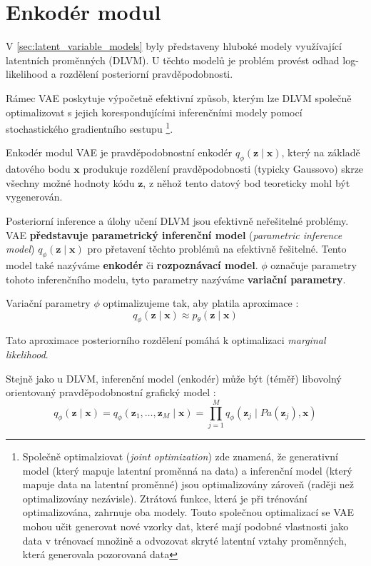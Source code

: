 \section{Enkodér modul}
\label{sec:vae_encoder}
V \autoref{sec:latent_variable_models} byly představeny hluboké modely využívající latentních proměnných (DLVM).
U těchto modelů je problém provést odhad log-likelihood a rozdělení posteriorní pravděpodobnosti.

Rámec VAE poskytuje výpočetně efektivní způsob, kterým lze DLVM společně optimalizovat s jejich korespondujícími inferenčními modely pomocí stochastického gradientního sestupu
\footnote{Společně optimalziovat (\emph{joint optimization}) zde znamená, že generativní model (který mapuje latentní proměnná na data) a inferenční model (který mapuje data na latentní proměnné) jsou optimalizovány zároveň (raději než optimalizovány nezávisle). Ztrátová funkce, která je při trénování optimalizována, zahrnuje oba modely. Touto společnou optimalizací se VAE mohou učit generovat nové vzorky dat, které mají podobné vlastnosti jako data v trénovací množině a odvozovat skryté latentní vztahy proměnných, která generovala pozorovaná data}.

Enkodér modul VAE je pravděpodobnostní enkodér $q_\phi(\textbf{z}\mid\textbf{x})$, který na základě datového bodu $\textbf{x}$ produkuje rozdělení pravděpodobnosti (typicky Gaussovo) skrze všechny možné hodnoty kódu $\mathbf{z}$, z něhož tento datový bod teoreticky mohl být vygenerován.

Posteriorní inference a úlohy učení DLVM jsou efektivně neřešitelné problémy.
VAE \textbf{představuje parametrický inferenční model} (\emph{parametric inference model}) $q_\phi(\textbf{z}\mid\textbf{x})$ pro přetavení těchto problémů na efektivně řešitelné.
Tento model také nazýváme \textbf{enkodér} či \textbf{rozpoznávací model}.
$\phi$ označuje parametry tohoto inferenčního modelu, tyto parametry nazýváme \textbf{variační parametry}. \cite{Kingma2019}


Variační parametry $\phi$ optimalizujeme tak, aby platila aproximace \cite{Kingma2014}:
\begin{equation}
    q_\phi(\textbf{z}\mid\textbf{x}) \approx p_\theta(\textbf{z}\mid\textbf{x})
\end{equation}

Tato aproximace posteriorního rozdělení pomáhá k optimalizaci \emph{marginal likelihood}.

Stejně jako u DLVM, inferenční model (enkodér) může být (téměř) libovolný orientovaný pravděpodobnostní grafický model \cite{Kingma2019}:
\begin{equation}
    q_\phi(\textbf{z}\mid\textbf{x}) = q_\phi(\textbf{z}_1,\dots,\textbf{z}_M\mid\textbf{x}) = \prod_{j=1}^{M} q_\phi(\textbf{z}_j\mid Pa(\textbf{z}_j), \textbf{x})
\end{equation}

